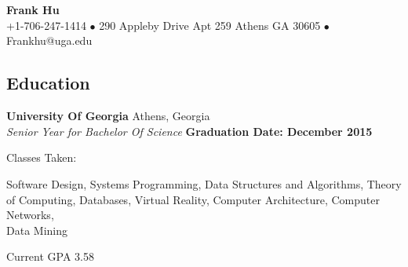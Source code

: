 \documentclass[margin,line]{resume}
\begin{document}
\section{}
{\centering \LARGE{\textbf{Frank Hu}}}
\\
\normalsize
   +1-706-247-1414 $\bullet$ 290 Appleby Drive Apt 259 Athens GA 30605 $\bullet$ Frankhu@uga.edu 

\begin{resume}

 
    \section{\mysidestyle Education}

    \textbf{University Of Georgia} Athens, Georgia \vspace{2mm}\\\vspace{1mm}%
    \textsl{Senior Year for Bachelor Of Science} \hfill \textbf{Graduation Date: December 2015	}\vspace{2mm}
    \begin{list2}
        \item Classes Taken:
        	\begin{list2} 
        	\item Software Design, Systems Programming, Data Structures and Algorithms, Theory of Computing, Databases, Virtual Reality, Computer Architecture, Computer Networks, \\Data Mining
        	\end{list2}
        \item  Current GPA 3.58
    \end{list2}\vspace{-1.5mm}


  

\end{resume}
\end{document}
